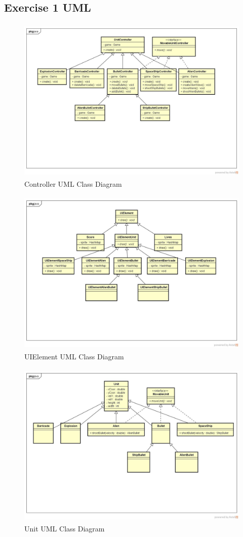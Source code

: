 \documentclass[10pt]{article}
\begin{document}
\subsection*{Exercise 1 UML} 
\begin{figure}[ht!]
\centering
\includegraphics[width=12cm, height=8cm]{ControllerUML.jpg}
\caption{Controller UML Class Diagram}
\end{figure}
\begin{figure}[ht!]
\centering
\includegraphics[width=12cm, height=8cm]{UiElementUML.jpg}
\caption{UIElement UML Class Diagram}
\end{figure}
\begin{figure}[ht!]
\centering
\includegraphics[width=12cm, height=8cm]{UnitUML.jpg}
\caption{Unit UML Class Diagram}
\end{figure}
\pagebreak
\clearpage
\end{document}
